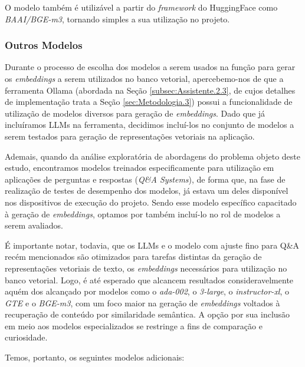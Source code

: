O modelo também é utilizável a partir do \textit{framework} do HuggingFace como \textit{BAAI/BGE-m3}, tornando simples a sua utilização no projeto.

\subsubsection{Outros Modelos}
\label{subsubsec:Metodologia.2.1.6}
Durante o processo de escolha dos modelos a serem usados na função para gerar os \textit{embeddings} a serem utilizados no banco vetorial, apercebemo-nos de que a ferramenta Ollama (abordada na Seção \ref{subsec:Assistente.2.3}, de cujos detalhes de implementação trata a Seção \ref{sec:Metodologia.3}) possui a funcionalidade de utilização de modelos diversos para geração de \textit{embeddings}. Dado que já incluíramos \ac{LLM}s na ferramenta, decidimos incluí-los no conjunto de modelos a serem testados para geração de representações vetoriais na aplicação.

Ademais, quando da análise exploratória de abordagens do problema objeto deste estudo, encontramos modelos treinados especificamente para utilização em aplicações de perguntas e respostas (\textit{Q\&A Systems}), de forma que, na fase de realização de testes de desempenho dos modelos, já estava um deles disponível nos dispositivos de execução do projeto. Sendo esse modelo específico capacitado à geração de \textit{embeddings}, optamos por também incluí-lo no rol de modelos a serem avaliados.

É importante notar, todavia, que os \ac{LLM}s e o modelo com ajuste fino para Q\&A recém mencionados são otimizados para tarefas distintas da geração de representações vetoriais de texto, os \textit{embeddings} necessários para utilização no banco vetorial. Logo, é até esperado que alcancem resultados consideravelmente aquém dos alcançado por modelos como o \textit{ada-002}, o \textit{3-large}, o \textit{instructor-xl}, o \textit{GTE} e o \textit{BGE-m3}, com um foco maior na geração de \textit{embeddings} voltados à recuperação de conteúdo por similaridade semântica. A opção por sua inclusão em meio aos modelos especializados se restringe a fins de comparação e curiosidade.

Temos, portanto, os seguintes modelos adicionais:

